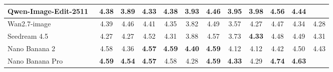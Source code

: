 \begin{table}[t]
{\begin{tabular}{l|cccccccccc|c}
            Qwen-Image-Edit-2511~\cite{wu2025qwen}
            & \color[HTML]{F88825}\textbf{4.38} & 3.89 & \color[HTML]{F88825}\textbf{4.33} & 4.38 & 3.93 & 4.46 & 3.95 & 3.98 &  4.56  & \color[HTML]{F88825}\textbf{4.44}
            & \cellcolor[HTML]{C8C8C8}{\color[HTML]{F88825}\textbf{4.26}} \\


            \midrule

            Wan2.7-image~\cite{nanobananapro}
            & 4.39 & 4.46 & 4.41 & 4.35 & 3.82 & 4.49 & 3.57 & 4.27 & 4.47 & 4.34
            & \cellcolor[HTML]{C8C8C8} 4.28  \\

            Seedream 4.5~\cite{seedream2025seedream}
            & 4.27 & 4.27 & 4.52 & 4.31 & 3.88 & 4.57 & 3.73 & \color[HTML]{319B62}\textbf{4.33} & 4.48 & 4.49
            & \cellcolor[HTML]{C8C8C8}4.31 \\

            
            Nano Banana 2~\cite{gemini3pro}
            & 4.58 & 4.36 & \color[HTML]{319B62}\textbf{4.57} & \color[HTML]{319B62}\textbf{4.59} & \color[HTML]{319B62}\textbf{4.40} & \color[HTML]{319B62}\textbf{4.59} & 4.12 & 4.12 & 4.42 & 4.50
            &  \cellcolor[HTML]{C8C8C8}4.43  \\
            
            Nano Banana Pro~\cite{nanobananapro}
            & \color[HTML]{319B62}\textbf{4.59} & \color[HTML]{319B62}\textbf{4.54} & \color[HTML]{319B62}\textbf{4.57} & 4.58 & 4.28 & \color[HTML]{319B62}\textbf{4.59} & \color[HTML]{319B62}\textbf{4.33} & 4.29 & \color[HTML]{319B62}\textbf{4.74} & \color[HTML]{319B62}\textbf{4.63}
            & \cellcolor[HTML]{C8C8C8}{\color[HTML]{319B62}\textbf{4.54}} \\

            
 


            \bottomrule
        \end{tabular}%
    }
    \vspace{-1.0em}
\end{table}